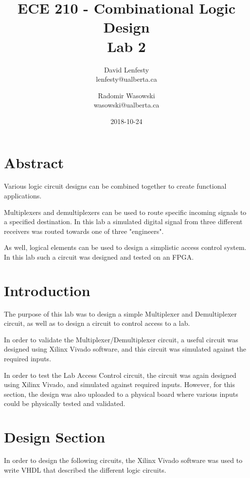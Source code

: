 \documentclass{article}
\title{ECE 210 - Combinational Logic Design \\ Lab 2}
\date{2018-10-24}
\author{David Lenfesty \\ lenfesty@ualberta.ca
    \and Radomir Wasowski \\ wasowski@ualberta.ca}
\begin{document}
    \doublespacing
    \maketitle
    \newpage

    \singlespacing

    \section{Abstract}

    Various logic circuit designs can be combined together to create
    functional applications.

    Multiplexers and demultiplexers can be used to route specific
    incoming signals to a specified destination. In this lab a simulated
    digital signal from three different receivers was routed towards
    one of three "engineers".
    
    As well, logical elements can be used to design a simplistic access control system.
    In this lab such a circuit was designed and tested on an FPGA.

    \section{Introduction}

    The purpose of this lab was to design a simple Multiplexer and Demultiplexer circuit,
    as well as to design a circuit to control access to a lab.

    In order to validate the Multiplexer/Demultiplexer circuit,
    a useful circuit was designed using Xilinx Vivado software,
    and this circuit was simulated against the required inputs.

    In order to test the Lab Access Control circuit, the circuit was again designed
    using Xilinx Vivado, and simulated against required inputs.
    However, for this section, the design was also uploaded to a physical board
    where various inputs could be physically tested and validated.

    \section{Design Section}

    In order to design the following circuits, the Xilinx Vivado software
    was used to write VHDL that described the different logic circuits.
\end{document}

